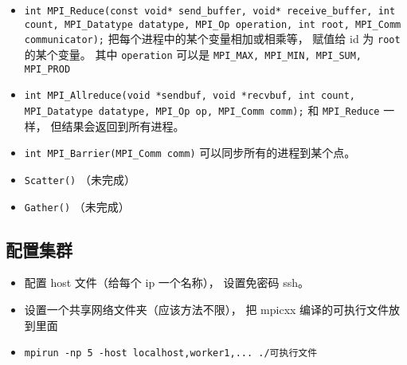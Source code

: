 \begin{itemize}
\item \verb|int MPI_Reduce(const void* send_buffer, void* receive_buffer, int count, MPI_Datatype datatype, MPI_Op operation, int root, MPI_Comm communicator);| 把每个进程中的某个变量相加或相乘等， 赋值给 id 为 \verb|root| 的某个变量。 其中 \verb|operation| 可以是 \verb|MPI_MAX, MPI_MIN, MPI_SUM, MPI_PROD|
\item \verb|int MPI_Allreduce(void *sendbuf, void *recvbuf, int count, MPI_Datatype datatype, MPI_Op op, MPI_Comm comm);| 和 \verb|MPI_Reduce| 一样， 但结果会返回到所有进程。
\item \verb|int MPI_Barrier(MPI_Comm comm)| 可以同步所有的进程到某个点。
\item \verb|Scatter()| （未完成）
\item \verb|Gather()| （未完成）
\end{itemize}

\subsection{配置集群}
\begin{itemize}
\item 配置 host 文件（给每个 ip 一个名称）， 设置免密码 ssh。
\item 设置一个共享网络文件夹（应该方法不限）， 把 mpicxx 编译的可执行文件放到里面
\item \verb|mpirun -np 5 -host localhost,worker1,... ./可执行文件|
\end{itemize}
